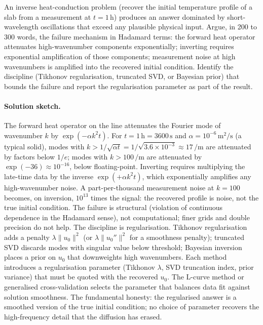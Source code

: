 \begin{exercise}
An inverse heat-conduction problem (recover the initial
temperature profile of a slab from a measurement at $t = 1\,\si
{\hour}$) produces an answer dominated by short-wavelength
oscillations that exceed any plausible physical input. Argue,
in 200 to 300 words, the failure mechanism in Hadamard terms:
the forward heat operator attenuates high-wavenumber components
exponentially; inverting requires exponential amplification of
those components; measurement noise at high wavenumbers is
amplified into the recovered initial condition. Identify the
discipline (Tikhonov regularisation, truncated SVD, or Bayesian
prior) that bounds the failure and report the regularisation
parameter as part of the result.

\paragraph{Solution sketch.}
The forward heat operator on the line attenuates the Fourier mode
of wavenumber $k$ by $\exp(-\alpha k^{2} t)$. For $t = 1\,\si
{\hour} = 3600\,\si{\second}$ and $\alpha = 10^{-6}\,\si{\meter
\squared\per\second}$ (a typical solid), modes with $k > 1/
\sqrt{\alpha t} = 1/\sqrt{3.6 \times 10^{-3}} \approx 17\,\si{
\per\meter}$ are attenuated by factors below $1/e$; modes with
$k > 100\,\si{\per\meter}$ are attenuated by $\exp(-36) \approx
10^{-16}$, below floating-point. Inverting requires multiplying
the late-time data by the inverse $\exp(+\alpha k^{2} t)$,
which exponentially amplifies any high-wavenumber noise. A
part-per-thousand measurement noise at $k = 100$ becomes, on
inversion, $10^{13}$ times the signal: the recovered profile is
noise, not the true initial condition. The failure is structural
(violation of continuous dependence in the Hadamard sense), not
computational; finer grids and double precision do not help.
The discipline is regularisation. Tikhonov regularisation adds a
penalty $\lambda \|u_{0}\|^{2}$ (or $\lambda \|u_{0}''\|^{2}$ for
a smoothness penalty); truncated SVD discards modes with singular
value below threshold; Bayesian inversion places a prior on
$u_{0}$ that downweights high wavenumbers. Each method introduces
a regularisation parameter (Tikhonov $\lambda$, SVD truncation
index, prior variance) that must be quoted with the recovered
$u_{0}$. The L-curve method or generalised cross-validation
selects the parameter that balances data fit against solution
smoothness. The fundamental honesty: the regularised answer is a
smoothed version of the true initial condition; no choice of
parameter recovers the high-frequency detail that the diffusion
has erased.
\end{exercise}

